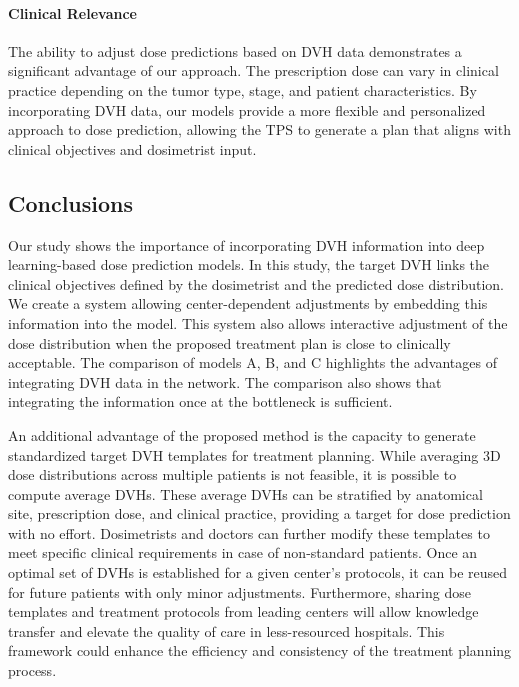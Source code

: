 \paragraph{Clinical Relevance}
The ability to adjust dose predictions based on DVH data demonstrates a significant advantage of our approach.
The prescription dose can vary in clinical practice depending on the tumor type, stage, and patient characteristics.
By incorporating DVH data, our models provide a more flexible and personalized approach to dose prediction, allowing the TPS to generate a plan that aligns with clinical objectives and dosimetrist input.

\subsection{Conclusions}
Our study shows the importance of incorporating DVH information into deep learning-based dose prediction models.
In this study, the target DVH links the clinical objectives defined by the dosimetrist and the predicted dose distribution.
We create a system allowing center-dependent adjustments by embedding this information into the model.
This system also allows interactive adjustment of the dose distribution when the proposed treatment plan is close to clinically acceptable.
The comparison of models A, B, and C highlights the advantages of integrating DVH data in the network.
The comparison also shows that integrating the information once at the bottleneck is sufficient.

An additional advantage of the proposed method is the capacity to generate standardized target DVH templates for treatment planning.
While averaging 3D dose distributions across multiple patients is not feasible, it is possible to compute average DVHs.
These average DVHs can be stratified by anatomical site, prescription dose, and clinical practice, providing a target for dose prediction with no effort.
Dosimetrists and doctors can further modify these templates to meet specific clinical requirements in case of non-standard patients.
Once an optimal set of DVHs is established for a given center's protocols, it can be reused for future patients with only minor adjustments.
Furthermore, sharing dose templates and treatment protocols from leading centers will allow knowledge transfer and elevate the quality of care in less-resourced hospitals.
This framework could enhance the efficiency and consistency of the treatment planning process.

